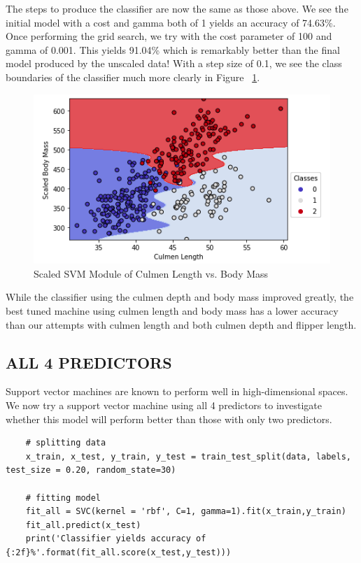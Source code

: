 \documentclass[12pt]{article}
\begin{document}
The steps to produce the classifier are now the same as those above. We see the initial model with a cost and gamma both of 1 yields an accuracy of 74.63\%. Once performing the grid search, we try with the cost parameter of 100 and gamma of 0.001. This yields 91.04\% which is remarkably better than the final model produced by the unscaled data! With a step size of 0.1, we see the class boundaries of the classifier much more clearly in Figure ~\ref{fig_fit_scaled_cl_bm}.

\begin{figure}[H]
    \centering
    \includegraphics[width=5in]{Figures/penguins/fit_scaled_cl_bm.png}
    \caption{Scaled SVM Module of Culmen Length vs. Body Mass}
    \label{fig_fit_scaled_cl_bm}
\end{figure}

While the classifier using the culmen depth and body mass improved greatly, the best tuned machine using culmen length and body mass has a lower accuracy than our attempts with culmen length and both culmen depth and flipper length.

\subsection{ALL 4 PREDICTORS}

Support vector machines are known to perform well in high-dimensional spaces. We now try a support vector machine using all 4 predictors to investigate whether this model will perform better than those with only two predictors.

\begin{verbatim}
    # splitting data
    x_train, x_test, y_train, y_test = train_test_split(data, labels, test_size = 0.20, random_state=30)
    
    # fitting model
    fit_all = SVC(kernel = 'rbf', C=1, gamma=1).fit(x_train,y_train)
    fit_all.predict(x_test)
    print('Classifier yields accuracy of {:2f}%'.format(fit_all.score(x_test,y_test)))
\end{verbatim}
\end{document}
